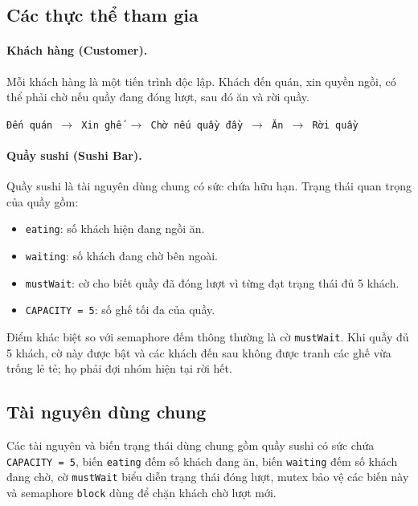 \subsection{Các thực thể tham gia}

\paragraph{Khách hàng (Customer).}
Mỗi khách hàng là một tiến trình độc lập. Khách đến quán, xin quyền ngồi, có
thể phải chờ nếu quầy đang đóng lượt, sau đó ăn và rời quầy.

\begin{center}
\texttt{Đến quán $\rightarrow$ Xin ghế $\rightarrow$ Chờ nếu quầy đầy
$\rightarrow$ Ăn $\rightarrow$ Rời quầy}
\end{center}

\paragraph{Quầy sushi (Sushi Bar).}
Quầy sushi là tài nguyên dùng chung có sức chứa hữu hạn. Trạng thái quan trọng
của quầy gồm:

\begin{itemize}
    \item \texttt{eating}: số khách hiện đang ngồi ăn.
    \item \texttt{waiting}: số khách đang chờ bên ngoài.
    \item \texttt{mustWait}: cờ cho biết quầy đã đóng lượt vì từng đạt trạng
    thái đủ 5 khách.
    \item \texttt{CAPACITY = 5}: số ghế tối đa của quầy.
\end{itemize}

Điểm khác biệt so với semaphore đếm thông thường là cờ \texttt{mustWait}. Khi
quầy đủ 5 khách, cờ này được bật và các khách đến sau không được tranh các ghế
vừa trống lẻ tẻ; họ phải đợi nhóm hiện tại rời hết.

\subsection{Tài nguyên dùng chung}

Các tài nguyên và biến trạng thái dùng chung gồm quầy sushi có sức chứa
\texttt{CAPACITY = 5}, biến \texttt{eating} đếm số khách đang ăn, biến
\texttt{waiting} đếm số khách đang chờ, cờ \texttt{mustWait} biểu diễn trạng
thái đóng lượt, mutex bảo vệ các biến này và semaphore \texttt{block} dùng để
chặn khách chờ lượt mới.

